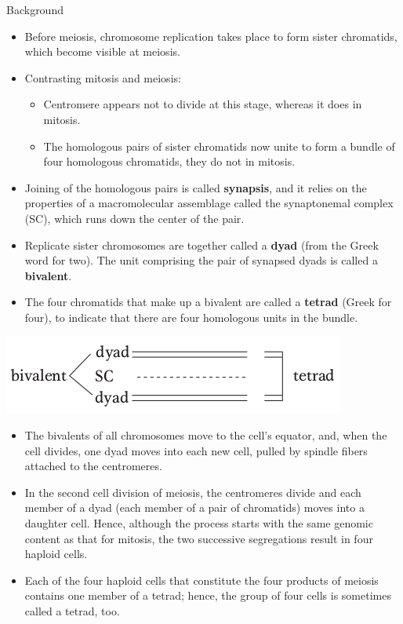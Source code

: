 \documentclass[11pt,ignorenonframetext,aspectratio=169]{beamer}
\providecommand{\tightlist}{%
  \setlength{\itemsep}{0pt}\setlength{\parskip}{0pt}}
\begin{document}
\begin{frame}{Background}
\protect\hypertarget{background-1}{}
\begin{itemize}
\tightlist
\item
  Before meiosis, chromosome replication takes place to form sister
  chromatids, which become visible at meiosis.
\item
  Contrasting mitosis and meiosis:

  \begin{itemize}
  \tightlist
  \item
    Centromere appears not to divide at this stage, whereas it does in
    mitosis.
  \item
    The homologous pairs of sister chromatids now unite to form a bundle
    of four homologous chromatids, they do not in mitosis.
  \end{itemize}
\item
  Joining of the homologous pairs is called \textbf{synapsis}, and it
  relies on the properties of a macromolecular assemblage called the
  synaptonemal complex (SC), which runs down the center of the pair.
\item
  Replicate sister chromosomes are together called a \textbf{dyad} (from
  the Greek word for two). The unit comprising the pair of synapsed
  dyads is called a \textbf{bivalent}.
\item
  The four chromatids that make up a bivalent are called a
  \textbf{tetrad} (Greek for four), to indicate that there are four
  homologous units in the bundle.
\end{itemize}
\end{frame}

\begin{frame}{}
\protect\hypertarget{section-11}{}
\begin{center}\includegraphics[width=0.45\linewidth]{../images/bivalent_tetrad} \end{center}

\begin{itemize}
\tightlist
\item
  The bivalents of all chromosomes move to the cell's equator, and, when
  the cell divides, one dyad moves into each new cell, pulled by spindle
  fibers attached to the centromeres.
\item
  In the second cell division of meiosis, the centromeres divide and
  each member of a dyad (each member of a pair of chromatids) moves into
  a daughter cell. Hence, although the process starts with the same
  genomic content as that for mitosis, the two successive segregations
  result in four haploid cells.
\item
  Each of the four haploid cells that constitute the four products of
  meiosis contains one member of a tetrad; hence, the group of four
  cells is sometimes called a tetrad, too.
\end{itemize}
\end{frame}
\end{document}
